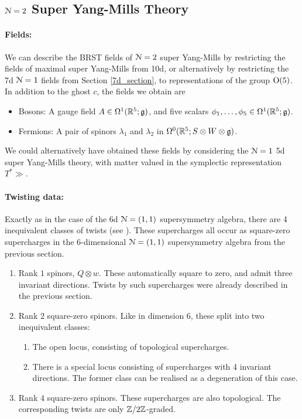 \documentclass[10pt, oneside]{article}
\begin{document}
\subsection{\texorpdfstring{$\mathcal{N} = 2$}{N=2} Super Yang-Mills Theory} \label{5d_2_section}

\paragraph{Fields:} We can describe the BRST fields of $\mathcal{N}=2$ super Yang-Mills by restricting the fields of maximal super Yang-Mills from 10d, or alternatively by restricting the 7d $\mathcal{N}=1$ fields from Section \ref{7d_section}, to representations of the group $\mathrm{O}(5)$.  In addition to the ghost $c$, the fields we obtain are
\begin{itemize}
 \item Bosons: A gauge field $A \in \Omega^1(\mathbb R^5; \mathfrak{g})$, and five scalars $\phi_1 ,\ldots, \phi_5 \in \Omega^1(\mathbb R^5; \mathfrak{g})$.
 \item Fermions: A pair of spinors $\lambda_1$ and $\lambda_2$ in $\Omega^0(\mathbb R^5; S \otimes W \otimes \mathfrak{g})$.
\end{itemize}
We could alternatively have obtained these fields by considering the $\mathcal{N}=1$ 5d super Yang-Mills theory, with matter valued in the symplectic representation $T^*\gg$.

\vspace{-10pt}
\paragraph{Twisting data:}
Exactly as in the case of the 6d $\mathcal{N}=(1,1)$ supersymmetry algebra, there are 4 inequivalent classes of twists (see \cite[Section 4.5]{ElliottSafronov}).  These supercharges all occur as square-zero supercharges in the 6-dimensional $\mathcal{N}=(1,1)$ supersymmetry algebra from the previous section.
\begin{enumerate}
 \item Rank $1$ spinors, $Q \otimes w$.  These automatically square to zero, and admit three invariant directions.  Twists by such supercharges were already described in the previous section.
 \item Rank $2$ square-zero spinors.  Like in dimension 6, these split into two inequivalent classes:
 \begin{enumerate}
 \item The open locus, consisting of topological supercharges.
 \item There is a special locus consisting of supercharges with 4 invariant directions.  The former class can be realised as a degeneration of this case.
 \end{enumerate}
 \item Rank $4$ square-zero spinors.  These supercharges are also topological.  The corresponding twists are only $\mathbb Z/2\mathbb Z$-graded.
\end{enumerate}
\end{document}
